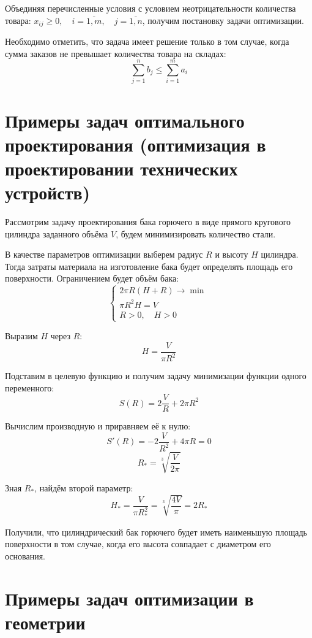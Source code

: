 \documentclass[17pt]{extarticle}
\begin{document}
Объединяя перечисленные условия с условием неотрицательности количества товара: \( x_{ij} \ge 0, \quad i = \overline{1,m}, \quad j = \overline{1,n} \), получим постановку задачи оптимизации.

Необходимо отметить, что задача имеет решение только в том случае, когда сумма заказов не превышает количества товара на складах:
\[
    \sum_{j=1}^n b_j \le \sum_{i=1}^m a_i
\]




\section{Примеры задач оптимального проектирования (оптимизация в проектировании технических устройств)}

Рассмотрим задачу проектирования бака горючего в виде прямого кругового цилиндра заданного объёма \( V \), будем минимизировать количество стали.

В качестве параметров оптимизации выберем радиус \( R \) и высоту \( H \) цилиндра. Тогда затраты материала на изготовление бака будет определять площадь его поверхности. Ограничением будет объём бака:
\[
    \begin{cases}
        2 \pi R (H + R) \to \min \\
        \pi R^2 H = V            \\
        R > 0, \quad H > 0
    \end{cases}
\]

Выразим \( H \) через \( R \):
\[
    H = \frac{V}{\pi R^2}
\]

Подставим в целевую функцию и получим задачу минимизации функции одного переменного:
\[
    S(R) = 2 \frac{V}{R} + 2 \pi R^2
\]

Вычислим производную и приравняем её к нулю:
\[
    S'(R) = -2 \frac{V}{R^2} + 4 \pi R = 0
\]
\[
    R_* = \sqrt[3]{\frac{V}{2 \pi}}
\]

Зная \( R_* \), найдём второй параметр:
\[
    H_* = \frac{V}{\pi R_*^2} = \sqrt[3]{\frac{4 V}{\pi}} = 2 R_*
\]

Получили, что цилиндрический бак горючего будет иметь наименьшую площадь поверхности в том случае, когда его высота совпадает с диаметром его основания.




\section{Примеры задач оптимизации в геометрии}
\end{document}
